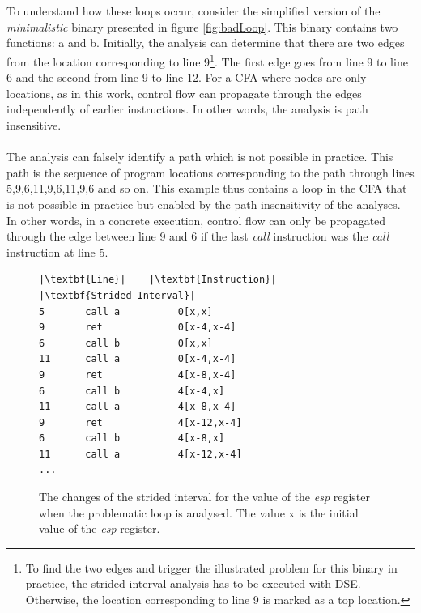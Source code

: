 \documentclass{kththesis}
\renewcommand{\it}[1]{\textit{#1}}
\begin{document}
\noindent
\\ \\
To understand how these loops occur, consider the simplified version of the \it{minimalistic} binary presented in figure \ref{fig:badLoop}. This binary contains two functions: a and b. Initially, the analysis can determine that there are two edges from the location corresponding to line 9\footnote{To find the two edges and trigger the illustrated problem for this binary in practice, the strided interval analysis has to be executed with DSE. Otherwise, the location corresponding to line 9 is marked as a top location.}. The first edge goes from line 9 to line 6 and the second from line 9 to line 12. For a CFA where nodes are only locations, as in this work, control flow can propagate through the edges independently of earlier instructions. In other words, the analysis is path insensitive.
\\ \\
The analysis can falsely identify a path which is not possible in practice. This path is the sequence of program locations corresponding to the path through lines 5,9,6,11,9,6,11,9,6 and so on. This example thus contains a loop in the CFA that is not possible in practice but enabled by the path insensitivity of the analyses. In other words, in a concrete execution, control flow can only be propagated through the edge between line 9 and 6 if the last \it{call} instruction was the \it{call} instruction at line 5.
\begin{figure}[!t]
    \centering
\begin{tcolorbox}
\begin{verbatim}
|\textbf{Line}|    |\textbf{Instruction}|     |\textbf{Strided Interval}|
5       call a          0[x,x]
9       ret             0[x-4,x-4]
6       call b          0[x,x]
11      call a          0[x-4,x-4]
9       ret             4[x-8,x-4]
6       call b          4[x-4,x]
11      call a          4[x-8,x-4]
9       ret             4[x-12,x-4]
6       call b          4[x-8,x]
11      call a          4[x-12,x-4]
...
\end{verbatim}
\end{tcolorbox}
\caption[The changes of the strided interval for the value of the \it{esp} register when the problematic loop is analysed.]{The changes of the strided interval for the value of the \it{esp} register when the problematic loop is analysed. The value x is the initial value of the \it{esp} register.}
    \label{fig:badLoopTrace}
\end{figure}
\end{document}
